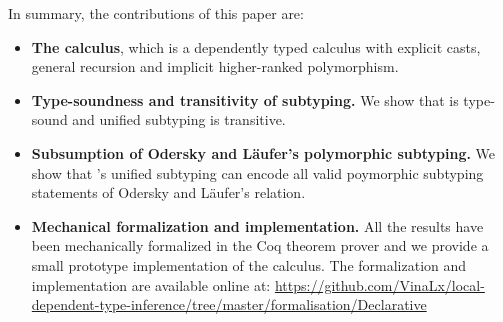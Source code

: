 In summary, the contributions of this paper are:

\begin{itemize}

\item {\bf The \name calculus}, which is a dependently typed calculus with explicit casts,
  general recursion and implicit higher-ranked polymorphism.

\item {\bf Type-soundness and transitivity of subtyping.} We show that \name
  is type-sound and unified subtyping is transitive.

\item {\bf Subsumption of Odersky and L\"aufer's polymorphic subtyping.} We show that \name's
  unified subtyping can encode all valid poymorphic subtyping statements of Odersky and L\"aufer's
  relation.

\item {\bf Mechanical formalization and implementation.} All the results have been mechanically
  formalized in the Coq theorem prover and we provide a small prototype implementation of the
  calculus. The formalization and implementation are available online at: \url{https://github.com/VinaLx/local-dependent-type-inference/tree/master/formalisation/Declarative}

\end{itemize}
